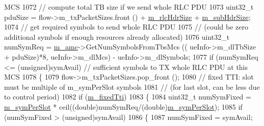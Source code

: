 \begin{DoxyCode}
{       MCS}
1072                                                 \textcolor{comment}{// compute total TB size if we send whole RLC PDU}
1073                                                 uint32\_t pduSize = flow->m\_txPacketSizes.front () + 
      \hyperlink{classns3_1_1MmWaveFlexTtiMaxWeightMacScheduler_a12646efe5a10dfd27c8839b224b2ed53}{m\_rlcHdrSize} + \hyperlink{classns3_1_1MmWaveFlexTtiMaxWeightMacScheduler_a0f66f1575529b6532871202961e92c86}{m\_subHdrSize};
1074                                                 \textcolor{comment}{// get required symbols to send whole RLC PDU}
1075                                                 \textcolor{comment}{// (could be zero additional symbols if enough resources
       already allocated)}
1076                                                 uint32\_t numSymReq = \hyperlink{classns3_1_1MmWaveFlexTtiMaxWeightMacScheduler_a36c22ad89fe5d6743a058f253a43a70d}{m\_amc}->GetNumSymbolsFromTbsMcs ((
      ueInfo->m\_dlTbSize + pduSize)*8, ueInfo->m\_dlMcs) - ueInfo->m\_dlSymbols;
1077                                                 \textcolor{keywordflow}{if} (numSymReq <= (\textcolor{keywordtype}{unsigned})symAvail)    \textcolor{comment}{// sufficient
       symbols to TX whole RLC PDU at this MCS}
1078                                                 \{
1079                                                         flow->m\_txPacketSizes.pop\_front ();
1080                                                         \textcolor{comment}{// fixed TTI: slot must be multiple of m\_symPerSlot
       symbols}
1081                                                         \textcolor{comment}{// (for last slot, can be less due to control
       period)}
1082                                                         \textcolor{keywordflow}{if} (\hyperlink{classns3_1_1MmWaveFlexTtiMaxWeightMacScheduler_a5642744f4685af9143c44bd8ed23077b}{m\_fixedTti})
1083                                                         \{
1084                                                                 uint32\_t numSymFixed = 
      \hyperlink{classns3_1_1MmWaveFlexTtiMaxWeightMacScheduler_a1f72c01284b245a37f959230bf15e46b}{m\_symPerSlot} * ceil((\textcolor{keywordtype}{double})numSymReq/(\textcolor{keywordtype}{double})\hyperlink{classns3_1_1MmWaveFlexTtiMaxWeightMacScheduler_a1f72c01284b245a37f959230bf15e46b}{m\_symPerSlot});
1085                                                                 \textcolor{keywordflow}{if} (numSymFixed > (\textcolor{keywordtype}{unsigned})symAvail)
1086                                                                 \{
1087                                                                         numSymFixed = symAvail;

\end{DoxyCode}
